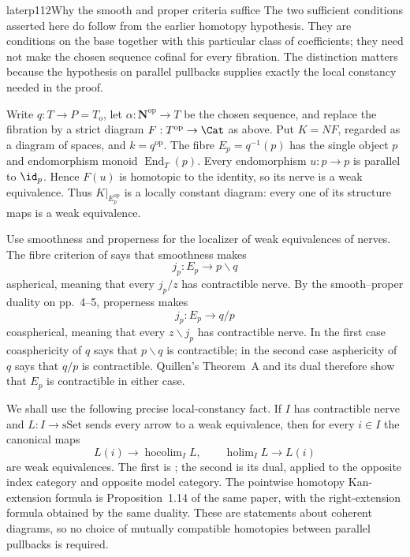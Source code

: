 \begin{dcomment}{later}{p112}{Why the smooth and proper criteria suffice}
The two sufficient conditions asserted here do follow from the earlier homotopy hypothesis. They are conditions on the base together with this particular class of coefficients; they need not make the chosen sequence cofinal for every fibration. The distinction matters because the hypothesis on parallel pullbacks supplies exactly the local constancy needed in the proof.

Write $q:T\to P=T_{\mathrm o}$, let $\alpha:\mathbf N^{\mathrm{op}}\to T$ be the chosen sequence, and replace the fibration by a strict diagram $F:T^{\mathrm{op}}\to\Cat$ as above. Put $K=NF$, regarded as a diagram of spaces, and $k=q^{\mathrm{op}}$. The fibre $E_p=q^{-1}(p)$ has the single object $p$ and endomorphism monoid $\operatorname{End}_T(p)$. Every endomorphism $u:p\to p$ is parallel to $\id_p$. Hence $F(u)$ is homotopic to the identity, so its nerve is a weak equivalence. Thus $K|_{E_p^{\mathrm{op}}}$ is a locally constant diagram: every one of its structure maps is a weak equivalence.

Use smoothness and properness for the localizer of weak equivalences of nerves. The fibre criterion of \citet[Theorem~1.2(b), printed p.~4]{Maltsiniotis2005Asphericite} says that smoothness makes
\[
 j_p:E_p\longrightarrow p\backslash q
\]
aspherical, meaning that every $j_p/z$ has contractible nerve. By the smooth--proper duality on pp.~4--5, properness makes
\[
 j_p:E_p\longrightarrow q/p
\]
coaspherical, meaning that every $z\backslash j_p$ has contractible nerve. In the first case coasphericity of $q$ says that $p\backslash q$ is contractible; in the second case asphericity of $q$ says that $q/p$ is contractible. Quillen's Theorem~A and its dual therefore show that $E_p$ is contractible in either case.

We shall use the following precise local-constancy fact. If $I$ has contractible nerve and $L:I\to\mathrm{sSet}$ sends every arrow to a weak equivalence, then for every $i\in I$ the canonical maps
\[
 L(i)\longrightarrow\operatorname{hocolim}_I L,
 \qquad
 \operatorname{holim}_I L\longrightarrow L(i)
\]
are weak equivalences. The first is \citet[Corollary~1.18, printed p.~599]{Cisinski2009LocallyConstant}; the second is its dual, applied to the opposite index category and opposite model category. The pointwise homotopy Kan-extension formula is Proposition~1.14 of the same paper, with the right-extension formula obtained by the same duality. These are statements about coherent diagrams, so no choice of mutually compatible homotopies between parallel pullbacks is required.


\end{dcomment}
